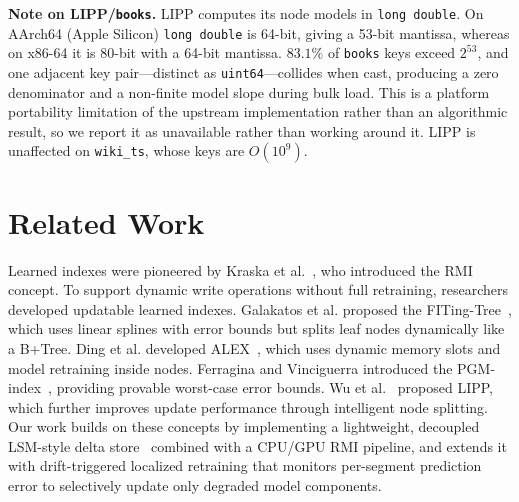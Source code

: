 \documentclass[10pt,twocolumn,a4paper]{article}
\begin{document}
\medskip
\noindent\textbf{Note on LIPP/\texttt{books}.} LIPP computes its node models in \texttt{long double}. On AArch64 (Apple Silicon) \texttt{long double} is 64-bit, giving a 53-bit mantissa, whereas on x86-64 it is 80-bit with a 64-bit mantissa. $83.1\%$ of \texttt{books} keys exceed $2^{53}$, and one adjacent key pair---distinct as \texttt{uint64}---collides when cast, producing a zero denominator and a non-finite model slope during bulk load. This is a platform portability limitation of the upstream implementation rather than an algorithmic result, so we report it as unavailable rather than working around it. LIPP is unaffected on \texttt{wiki\_ts}, whose keys are $O(10^9)$.

\section{Related Work}
Learned indexes were pioneered by Kraska et al.~\cite{kraska2018case}, who introduced the RMI concept. To support dynamic write operations without full retraining, researchers developed updatable learned indexes. Galakatos et al. proposed the FITing-Tree~\cite{galakatos2019fiting}, which uses linear splines with error bounds but splits leaf nodes dynamically like a B+Tree. Ding et al. developed ALEX~\cite{ding2020alex}, which uses dynamic memory slots and model retraining inside nodes. Ferragina and Vinciguerra introduced the PGM-index~\cite{ferragina2020pgm}, providing provable worst-case error bounds. Wu et al.~\cite{wu2021lipp} proposed LIPP, which further improves update performance through intelligent node splitting. Our work builds on these concepts by implementing a lightweight, decoupled LSM-style delta store~\cite{oneil1996log} combined with a CPU/GPU RMI pipeline, and extends it with drift-triggered localized retraining that monitors per-segment prediction error to selectively update only degraded model components.
\end{document}
